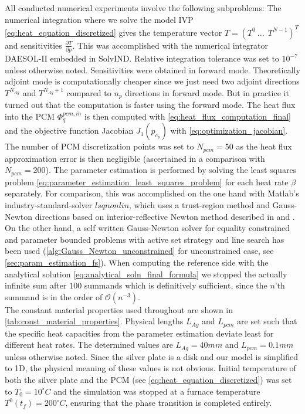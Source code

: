 \documentclass{scrartcl}[12pt, halfparskip]
\numberwithin{equation}{section}
\numberwithin{figure}{section}
\numberwithin{table}{section}
\begin{document}
All conducted numerical experiments involve the following subproblems: The numerical integration where we solve the model IVP \cref{eq:heat_equation_discretized} gives the temperature vector $T = (T^0 \ ... \ \ T^{N-1} )^T$ and sensitivities $\frac{\partial T}{\partial p}$. 
This was accomplished with the numerical integrator DAESOL-II embedded in SolvIND. Relative integration tolerance was set to $10^{-7}$ unless otherwise noted.
Sensitivities were obtained in forward mode. Theoretically adjoint mode is computationally cheaper since we just need two adjoint directions $T^{N_{Ag}}$ and $T^{N_{Ag}+1}$ compared to $n_p$ directions in forward mode. But in practice it turned out that the computation is faster using the forward mode.
The heat flux into the PCM $\varPhi_q^{pcm,in}$ is then computed with \cref{eq:heat_flux_computation_final} and the objective function Jacobian $J_1(p_{c_p})$ with \cref{eq:optimization_jacobian}. 
The number of PCM discretization points was set to $N_{pcm}=50$ as the heat flux approximation error is then negligible (ascertained in a comparison with $N_{pcm}=200$). 
The parameter estimation is performed by solving the least squares problem \cref{eq:parameter_estimation_least_squares_problem} for each heat rate $\beta$ separately. 
For comparison, this was accomplished on the one hand with Matlab's industry-standard-solver $lsqnonlin$, which uses a trust-region method and Gauss-Newton directions based on interior-reflective Newton method described in \cite{lsqnonlin_alg1} and \cite{lsqnonlin_alg2}. 
On the other hand, a self written Gauss-Newton solver for equality constrained and parameter bounded problems with active set strategy and line search has been used (\cref{alg:Gauss_Newton_unconstrained} for unconstrained case, see \cref{sec:param_estimation_fs}).
When computing the reference side with the analytical solution \cref{eq:analytical_soln_final_formula} we stopped the actually infinite sum after $100$ summands which is definitively sufficient, since the $n$'th summand is in the order of $\mathcal{O}(n^{-3})$. \\

The constant material properties used throughout are shown in \cref{tab:const_material_properties}.
Physical lengths $L_{Ag}$ and $L_{pcm}$ are set such that the specific heat capacities from the parameter estimation deviate least for different heat rates. The determined values are $L_{Ag}=40mm$ and $L_{pcm}=0.1mm$ unless otherwise noted. Since the silver plate is a disk and our model is simplified to 1D, the physical meaning of these values is not obvious.
Initial temperature of both the silver plate and the PCM (see \cref{eq:heat_equation_discretized}) was set to $T_0=10^\circ C$ and the simulation was stopped at a furnace temperature $T^0(t_f)=200^\circ C$, ensuring that the phase transition is completed entirely. \\
\end{document}
